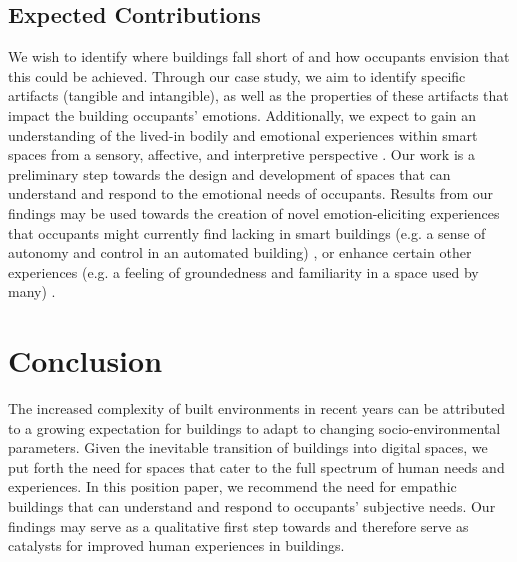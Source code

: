 \documentclass [sigconf, review, anonymous] {acmart}
\begin{document}
\subsection{Expected Contributions}
We wish to identify where buildings fall short of  and how occupants envision that this could be achieved. Through our case study, we aim to identify specific artifacts (tangible and intangible), as well as the properties of these artifacts that impact the building occupants' emotions. Additionally, we expect to gain an understanding of the lived-in bodily and emotional experiences within smart spaces from a sensory, affective, and interpretive perspective \cite{giaccardi2015foundations}. Our work is a preliminary step towards the design and development of spaces that can understand and respond to the emotional needs of occupants. Results from our findings may be used towards the creation of novel emotion-eliciting experiences that occupants might currently find lacking in smart buildings (e.g. a sense of autonomy and control in an automated building) \cite{moreno2014user}, or enhance certain other experiences (e.g. a feeling of groundedness and familiarity in a space used by many) \cite{rehman2022personalisedcomfort}.  

\section{Conclusion}
The increased complexity of built environments in recent years can be attributed to a growing expectation for buildings to adapt to changing socio-environmental parameters. Given the inevitable transition of buildings into digital spaces, we put forth the need for spaces that cater to the full spectrum of human needs and experiences. In this position paper, we recommend the need for empathic buildings that can understand and respond to occupants' subjective needs.  Our findings may serve as a qualitative first step towards  and therefore serve as catalysts for improved human experiences in buildings. 







\end{document}
